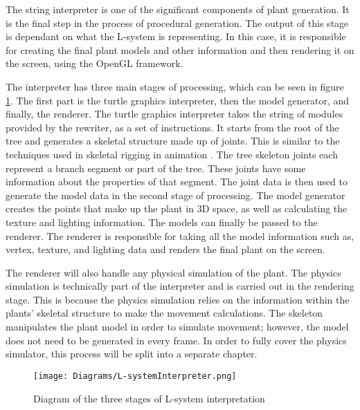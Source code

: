 
\lettrine[lines=3]{T}{}he string interpreter is one of the significant components of plant generation. It is the final step in the process of procedural generation. The output of this stage is dependant on what the L-system is representing. In this case, it is responsible for creating the final plant models and other information and then rendering it on the screen, using the OpenGL framework. 

The interpreter has three main stages of processing, which can be seen in figure \ref{l-system interpreter}. The first part is the turtle graphics interpreter, then the model generator, and finally, the renderer. The turtle graphics interpreter takes the string of modules provided by the rewriter, as a set of instructions. It starts from the root of the tree and generates a skeletal structure made up of joints. This is similar to the techniques used in skeletal rigging in animation \cite{gregory2014game}. The tree skeleton joints each represent a branch segment or part of the tree. These joints have some information about the properties of that segment. The joint data is then used to generate the model data in the second stage of processing. The model generator creates the points that make up the plant in 3D space, as well as calculating the texture and lighting information. The models can finally be passed to the renderer. The renderer is responsible for taking all the model information such as, vertex, texture, and lighting data and renders the final plant on the screen. 

The renderer will also handle any physical simulation of the plant. The physics simulation is technically part of the interpreter and is carried out in the rendering stage. This is because the physics simulation relies on the information within the plants' skeletal structure to make the movement calculations. The skeleton manipulates the plant model in order to simulate movement; however, the model does not need to be generated in every frame. In order to fully cover the physics simulator, this process will be split into a separate chapter. 



\begin{figure}[htbp]
	{\centering
		\vspace{7px}
		\texttt{[image: Diagrams/L-systemInterpreter.png]}
		\caption{Diagram of the three stages of L-system interpretation} \label{l-system interpreter}
	}
\end{figure}
\FloatBarrier

